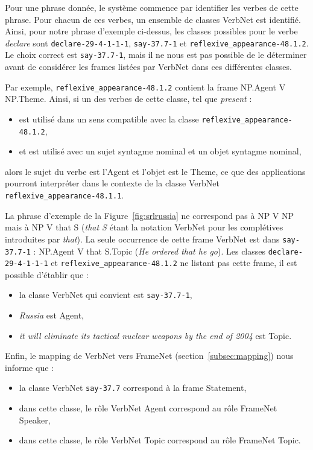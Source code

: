 Pour une phrase donnée, le système commence par identifier les verbes de cette
phrase. Pour chacun de ces verbes, un ensemble de classes VerbNet est
identifié. Ainsi, pour notre phrase d'exemple ci-dessus, les classes possibles
pour le verbe \textit{declare} sont \texttt{declare-29-4-1-1-1},
\texttt{say-37.7-1} et \texttt{reflexive\_appearance-48.1.2}. Le choix correct
est \texttt{say-37.7-1}, mais il ne nous est pas possible de le déterminer
avant de considérer les frames listées par VerbNet dans ces différentes
classes.

Par exemple, \texttt{reflexive\_appearance-48.1.2} contient la frame NP.Agent V
NP.Theme. Ainsi, si un des verbes de cette classe, tel que \textit{present} :
\begin{itemize}
    \item est utilisé dans un sens compatible avec la classe
        \texttt{reflexive\_appearance-48.1.2},
    \item et est utilisé avec un sujet syntagme nominal et un objet syntagme
        nominal,
\end{itemize}
alors le sujet du verbe est l'Agent et l'objet est le Theme, ce que des
applications pourront interpréter dans le contexte de la classe VerbNet
\texttt{reflexive\_appearance-48.1.1}.

La phrase d'exemple de la Figure~\ref{fig:srlrussia} ne correspond pas à NP V
NP mais à NP V that S (\textit{that S} étant la notation VerbNet pour les
complétives introduites par \textit{that}). La seule occurrence de cette frame
VerbNet est dans \texttt{say-37.7-1} : NP.Agent V that S.Topic (\textit{He
ordered that he go}). Les classes \texttt{declare-29-4-1-1-1} et
\texttt{reflexive\_appearance-48.1.2} ne listant pas cette frame, il est
possible d'établir que :

\begin{itemize}
    \item la classe VerbNet qui convient est \texttt{say-37.7-1},
    \item \textit{Russia} est Agent,
    \item \textit{it will eliminate its tactical nuclear weapons by the end of 2004} est Topic.
\end{itemize}

Enfin, le mapping de VerbNet vers FrameNet (section~\ref{subsec:mapping}) nous
informe que :

\begin{itemize}
    \item la classe VerbNet \texttt{say-37.7} correspond à la frame Statement,
    \item dans cette classe, le rôle VerbNet Agent correspond au rôle FrameNet Speaker,
    \item dans cette classe, le rôle VerbNet Topic correspond au rôle FrameNet Topic.
\end{itemize}

